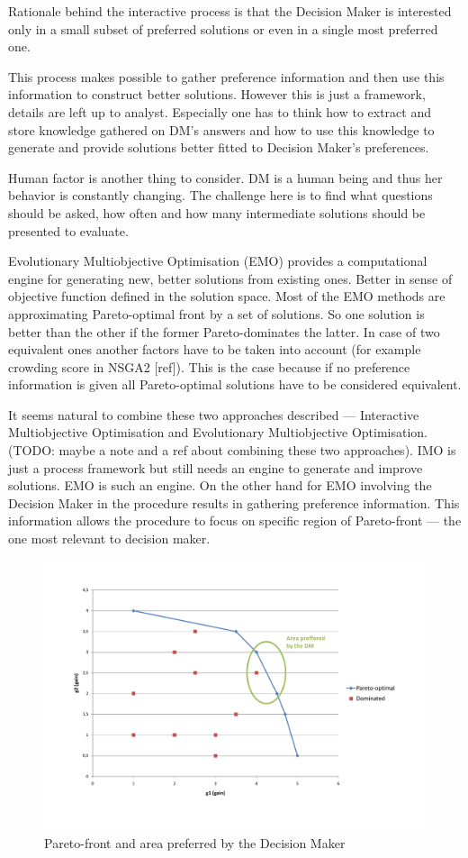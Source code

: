 Rationale behind the interactive process is that the Decision Maker is
interested only in a small subset of preferred solutions or even in a single
most preferred one.

This process makes possible to gather preference information and then use this
information to construct better solutions. However this is just a framework,
details are left up to analyst. Especially one has to think how to extract and
store knowledge gathered on DM's answers and how to use this knowledge to
generate and provide solutions better fitted to Decision Maker's
preferences.

Human factor is another thing to consider. DM is a human being and thus her
behavior is constantly changing. The challenge here is to find what questions
should be asked, how often and how many intermediate solutions should be
presented to evaluate. 

Evolutionary Multiobjective Optimisation (EMO) provides a computational engine
for generating new, better solutions from existing ones. Better in sense of
objective function defined in the solution space. Most of the EMO methods are
approximating Pareto-optimal front by a set of solutions. So one solution is
better than the other if the former Pareto-dominates the latter. In case of
two equivalent ones another factors have to be taken into account (for example
crowding score in NSGA2 [ref]). This is the case because if no preference
information is given all Pareto-optimal solutions have to be considered
equivalent.

It seems natural to combine these two approaches described --- Interactive
Multiobjective Optimisation and Evolutionary Multiobjective
Optimisation. (TODO: maybe a note and a ref about combining these two
approaches). IMO is just a process framework but still needs an engine to
generate and improve solutions. EMO is such an engine. On the other hand for
EMO involving the Decision Maker in the procedure results in gathering
preference information. This information allows the procedure to focus on
specific region of Pareto-front --- the one most relevant to decision maker.

\begin{figure}
  \centering \includegraphics[width=1.2\textwidth]{img/pareto}
  \caption{Pareto-front and area preferred by the Decision Maker}
  \label{pareto}
\end{figure}

